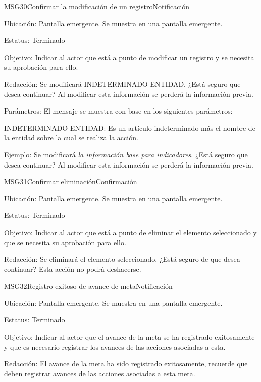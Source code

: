 \begin{mensaje}{MSG30}{Confirmar la modificación de un registro}{Notificación}
\item[Ubicación:] Pantalla emergente. Se muestra en una pantalla emergente.
\item[Estatus:] Terminado
\item[Objetivo:] Indicar al actor que está a punto de modificar un registro y se necesita su aprobación para ello.
\item[Redacción:] Se modificará INDETERMINADO ENTIDAD. ¿Está seguro que desea continuar? Al modificar esta información se perderá la información previa.
\item[Parámetros:] El mensaje se muestra con base en los siguientes parámetros:
	\begin{Citemize}
		\item INDETERMINADO ENTIDAD: Es un artículo indeterminado más el nombre de la entidad sobre la cual se realiza la acción.
	\end{Citemize}
	\item[Ejemplo:] Se modificará {\em la información base para indicadores}. ¿Está seguro que desea continuar? Al modificar esta información se perderá la información previa.
\end{mensaje}
\begin{mensaje}{MSG31}{Confirmar eliminación}{Confirmación}
    \item[Ubicación:] Pantalla emergente. Se muestra en una pantalla emergente.
    \item[Estatus:] Terminado
    \item[Objetivo:] Indicar al actor que está a punto de eliminar el elemento seleccionado y que se necesita su aprobación para ello.
    \item[Redacción:] Se eliminará el elemento seleccionado. ¿Está seguro de que desea continuar? Esta acción no podrá deshacerse.
\end{mensaje}
\begin{mensaje}{MSG32}{Registro exitoso de avance de meta}{Notificación}
\item[Ubicación:] Pantalla emergente. Se muestra en una pantalla emergente.
\item[Estatus:] Terminado
\item[Objetivo:] Indicar al actor que el avance de la meta se ha registrado exitosamente y que es necesario registrar los avances de las acciones asociadas a esta.
\item[Redacción:] El avance de la meta ha sido registrado exitosamente, recuerde que deben registrar avances de las acciones asociadas a esta meta.
\end{mensaje}
